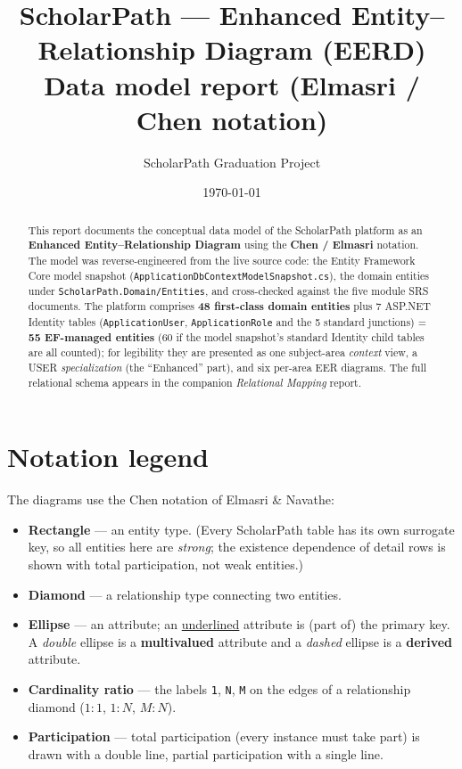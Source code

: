 \documentclass[11pt,a4paper]{article}
\title{\textbf{ScholarPath --- Enhanced Entity--Relationship Diagram (EERD)}\\[2pt]
\large Data model report (Elmasri / Chen notation)}
\author{ScholarPath Graduation Project}
\date{\today}
\begin{document}
\maketitle
\thispagestyle{fancy}

\begin{abstract}
\noindent This report documents the conceptual data model of the ScholarPath
platform as an \textbf{Enhanced Entity--Relationship Diagram} using the
\textbf{Chen / Elmasri} notation. The model was reverse-engineered from the live
source code: the Entity Framework Core model snapshot
(\texttt{ApplicationDbContextModelSnapshot.cs}), the domain entities under
\texttt{ScholarPath.Domain/Entities}, and cross-checked against the five module
SRS documents. The platform comprises \textbf{48 first-class domain entities}
plus 7 ASP.NET Identity tables (\texttt{ApplicationUser}, \texttt{ApplicationRole}
and the 5 standard junctions) = \textbf{55 EF-managed entities} (60 if the model
snapshot's standard Identity child tables are all counted); for
legibility they are presented as one subject-area \emph{context} view, a USER
\emph{specialization} (the ``Enhanced'' part), and six per-area EER diagrams.
The full relational schema appears in the companion \emph{Relational Mapping}
report.
\end{abstract}

\tableofcontents
\bigskip

\section{Notation legend}
The diagrams use the Chen notation of Elmasri \& Navathe:
\begin{itemize}
  \item \textbf{Rectangle} --- an entity type. (Every ScholarPath table has its
        own surrogate key, so all entities here are \emph{strong}; the existence
        dependence of detail rows is shown with total participation, not weak
        entities.)
  \item \textbf{Diamond} --- a relationship type connecting two entities.
  \item \textbf{Ellipse} --- an attribute; an \underline{underlined} attribute is
        (part of) the primary key. A \emph{double} ellipse is a
        \textbf{multivalued} attribute and a \emph{dashed} ellipse is a
        \textbf{derived} attribute.
  \item \textbf{Cardinality ratio} --- the labels \texttt{1}, \texttt{N},
        \texttt{M} on the edges of a relationship diamond
        ($1{:}1$, $1{:}N$, $M{:}N$).
  \item \textbf{Participation} --- total participation (every instance must
        take part) is drawn with a double line, partial participation with a
        single line.
\end{itemize}
\end{document}
